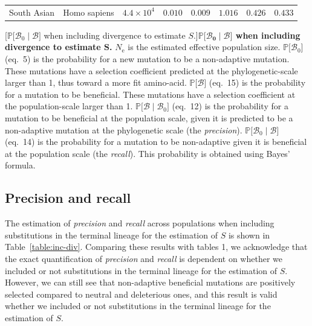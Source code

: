 \documentclass{article}
\newcommand{\Ne}{N_{\text{e}}}
\newcommand{\proba}{\mathbb{P}}
\newcommand{\SphyBen}{\mathcal{B}_0}
\newcommand{\given}{\mid}
\newcommand{\Spop}{S}
\newcommand{\SpopBen}{\mathcal{B}}
\begin{document}
\begin{center}
\begin{longtable*}{|l|l|r|r|r|r|r|r|}
            South Asian & Homo sapiens & $4.4\times 10^{4}$ & $ 0.010$ & $ 0.009$ & $ 1.016$ & $ 0.426$ & $ 0.433$ \\
        \end{longtable*}
        [$\proba{[}\SphyBen\given \SpopBen {]}$ when including divergence to estimate $\Spop$.]{\textbf{$\bm{\proba{[}\SphyBen\given \SpopBen {]}}$ when including divergence to estimate $\bm{\Spop}$.}
        $\Ne$ is the estimated effective population size.
        $\proba{[} \SphyBen {]}$ (eq.~5) is the probability for a new mutation to be a non-adaptive mutation.
        These mutations have a selection coefficient predicted at the phylogenetic-scale larger than 1, thus toward a more fit amino-acid.
        $\proba{[} \SpopBen {]}$ (eq.~15) is the probability for a mutation to be beneficial.
        These mutations have a selection coefficient at the population-scale larger than 1.
        $\proba{[} \SpopBen \given \SphyBen{]}$ (eq.~12) is the probability for a mutation to be beneficial at the population scale, given it is predicted to be a non-adaptive mutation at the phylogenetic scale (the \textit{precision}).
        $\proba{[} \SphyBen \given \SpopBen{]}$ (eq.~14) is the probability for a mutation to be non-adaptive given it is beneficial at the population scale (the \textit{recall}).
        This probability is obtained using Bayes' formula.\label{table:inc-div-bayes}}
    \end{center}

    \newpage

    \subsection{Precision and recall}
    The estimation of \textit{precision} and \textit{recall} across populations when including substitutions in the terminal lineage for the estimation of $\Spop$ is shown in Table~\ref{table:inc-div}.
    Comparing these results with tables 1, we acknowledge that the exact quantification of \textit{precision} and \textit{recall} is dependent on whether we included or not substitutions in the terminal lineage for the estimation of $\Spop$.
    However, we can still see that non-adaptive beneficial mutations are positively selected compared to neutral and deleterious ones, and this result is valid whether we included or not substitutions in the terminal lineage for the estimation of $\Spop$.
\end{document}

